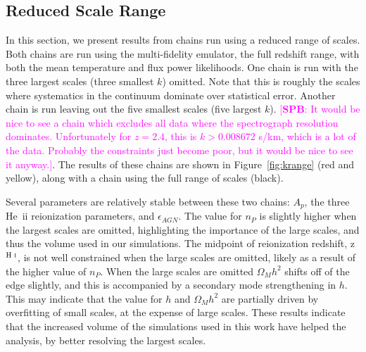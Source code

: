 \documentclass[a4paper,11pt]{article}
\newcommand{\spb}[1]{{\textcolor{magenta}{[{\bf SPB}: #1]}}}
\begin{document}
\subsection{Reduced Scale Range}\label{sec:reducedk}

In this section, we present results from chains run using a reduced range of scales.
Both chains are run using the multi-fidelity emulator, the full redshift range, with both the mean temperature and flux power likelihoods.
One chain is run with the three largest scales (three smallest $k$) omitted.
Note that this is roughly the scales where systematics in the continuum dominate over statistical error.
Another chain is run leaving out the five smallest scales (five largest $k$).
\spb{It would be nice to see a chain which excludes all data where the spectrograph resolution dominates. Unfortunately for $z = 2.4$, this is $k > 0.008672$ s/km, which is a lot of the data. Probably the constraints just become poor, but it would be nice to see it anyway.}.
The results of these chains are shown in Figure~\ref{fig:krange} (red and yellow), along with a chain using the full range of scales (black).

Several parameters are relatively stable between these two chains: $A_p$, the three He~{\sc ii} reionization parameters, and $\epsilon_{AGN}$.
The value for $n_P$ is slightly higher when the largest scales are omitted, highlighting the importance of the large scales, and thus the volume used in our simulations.
The midpoint of reionization redshift, z$^{\text{H~{\sc i}}}$, is not well constrained when the large scales are omitted, likely as a result of the higher value of $n_P$.
When the large scales are omitted $\Omega_M h^2$ shifts off of the edge slightly, and this is accompanied by a secondary mode strengthening in $h$.
This may indicate that the value for $h$ and $\Omega_M h^2$ are partially driven by overfitting of small scales, at the expense of large scales.
These results indicate that the increased volume of the simulations used in this work have helped the analysis, by better resolving the largest scales.
\end{document}
